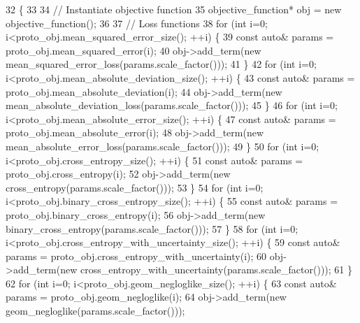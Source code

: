 \begin{DoxyCode}
32                                                                                                \{
33 
34   \textcolor{comment}{// Instantiate objective function}
35   objective\_function* obj = \textcolor{keyword}{new} objective\_function();
36 
37   \textcolor{comment}{// Loss functions}
38   \textcolor{keywordflow}{for} (\textcolor{keywordtype}{int} i=0; i<proto\_obj.mean\_squared\_error\_size(); ++i) \{
39     \textcolor{keyword}{const} \textcolor{keyword}{auto}& params = proto\_obj.mean\_squared\_error(i);
40     obj->add\_term(\textcolor{keyword}{new} mean\_squared\_error\_loss(params.scale\_factor()));
41   \}
42   \textcolor{keywordflow}{for} (\textcolor{keywordtype}{int} i=0; i<proto\_obj.mean\_absolute\_deviation\_size(); ++i) \{
43     \textcolor{keyword}{const} \textcolor{keyword}{auto}& params = proto\_obj.mean\_absolute\_deviation(i);
44     obj->add\_term(\textcolor{keyword}{new} mean\_absolute\_deviation\_loss(params.scale\_factor()));
45   \}
46   \textcolor{keywordflow}{for} (\textcolor{keywordtype}{int} i=0; i<proto\_obj.mean\_absolute\_error\_size(); ++i) \{
47     \textcolor{keyword}{const} \textcolor{keyword}{auto}& params = proto\_obj.mean\_absolute\_error(i);
48     obj->add\_term(\textcolor{keyword}{new} mean\_absolute\_error\_loss(params.scale\_factor()));
49   \}
50   \textcolor{keywordflow}{for} (\textcolor{keywordtype}{int} i=0; i<proto\_obj.cross\_entropy\_size(); ++i) \{
51     \textcolor{keyword}{const} \textcolor{keyword}{auto}& params = proto\_obj.cross\_entropy(i);
52     obj->add\_term(\textcolor{keyword}{new} cross\_entropy(params.scale\_factor()));
53   \}
54   \textcolor{keywordflow}{for} (\textcolor{keywordtype}{int} i=0; i<proto\_obj.binary\_cross\_entropy\_size(); ++i) \{
55     \textcolor{keyword}{const} \textcolor{keyword}{auto}& params = proto\_obj.binary\_cross\_entropy(i);
56     obj->add\_term(\textcolor{keyword}{new} binary\_cross\_entropy(params.scale\_factor()));
57   \}
58   \textcolor{keywordflow}{for} (\textcolor{keywordtype}{int} i=0; i<proto\_obj.cross\_entropy\_with\_uncertainty\_size(); ++i) \{
59     \textcolor{keyword}{const} \textcolor{keyword}{auto}& params = proto\_obj.cross\_entropy\_with\_uncertainty(i);
60     obj->add\_term(\textcolor{keyword}{new} cross\_entropy\_with\_uncertainty(params.scale\_factor()));
61   \}
62   \textcolor{keywordflow}{for} (\textcolor{keywordtype}{int} i=0; i<proto\_obj.geom\_negloglike\_size(); ++i) \{
63     \textcolor{keyword}{const} \textcolor{keyword}{auto}& params = proto\_obj.geom\_negloglike(i);
64     obj->add\_term(\textcolor{keyword}{new} geom\_negloglike(params.scale\_factor()));

\end{DoxyCode}
